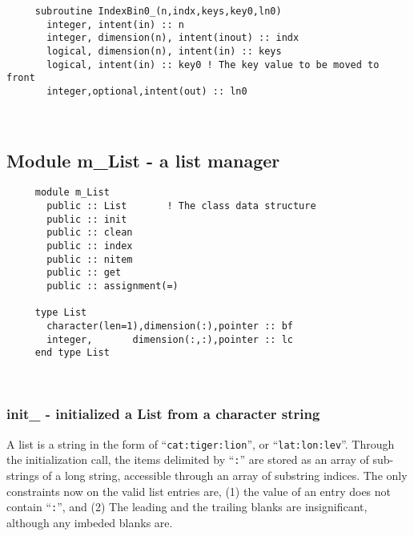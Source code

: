 \begin{verbatim} 
     subroutine IndexBin0_(n,indx,keys,key0,ln0)
       integer, intent(in) :: n
       integer, dimension(n), intent(inout) :: indx
       logical, dimension(n), intent(in) :: keys
       logical, intent(in) :: key0 ! The key value to be moved to front
       integer,optional,intent(out) :: ln0
 \end{verbatim} %


 
 
\mbox{}\hrulefill\ 
 
  \subsection{Module m\_List - a list manager }

\begin{verbatim} 
     module m_List 
       public :: List		! The class data structure
       public :: init
       public :: clean
       public :: index
       public :: nitem
       public :: get
       public :: assignment(=)
 
     type List
       character(len=1),dimension(:),pointer :: bf
       integer,       dimension(:,:),pointer :: lc
     end type List
 \end{verbatim} %
 
 
\mbox{}\hrulefill\ 
 
  \subsubsection{init\_ - initialized a List from a character string}

  	A list is a string in the form of ``\verb"cat:tiger:lion"'',
     or ``\verb"lat:lon:lev"''.  Through the initialization call, the
     items delimited by ``\verb":"'' are stored as an array of sub-
     strings of a long string, accessible through an array of substring
     indices.  The only constraints now on the valid list entries are,
     (1) the value of an entry does not contain ``\verb":"'', and (2)
     The leading and the trailing blanks are insignificant, although
     any imbeded blanks are.
  
